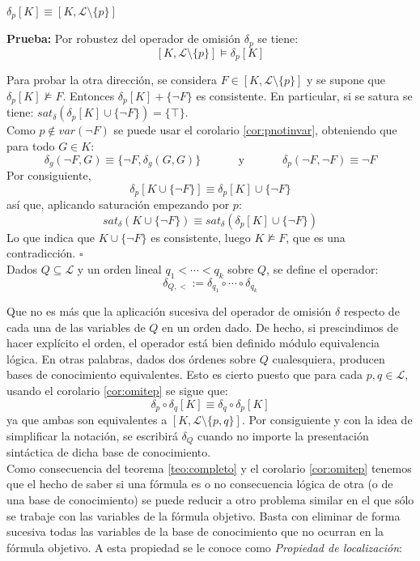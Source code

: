 \cor \label{cor:omitep} $\delta_p [K] \equiv [K, \mathcal{L} \setminus \{ p \}]$

\noindent \textbf{Prueba:} Por robustez del operador de omisión $\delta_p$ se tiene:
$$[K, \mathcal{L} \setminus \{ p \}] \vDash \delta_p [K]$$

Para probar la otra dirección, se considera $F\in [K, \mathcal{L} \setminus \{ p \}]$ y se supone que $\delta_p [K] \nvDash F$. Entonces $\delta_p [K] + \{ \neg F \}$ es consistente. En particular, si se satura se tiene: $sat_{\delta}(\delta_p [K] \cup \{ \neg F \}) = \{ \top \}$.\\
Como $p \notin var(\neg F)$ se puede usar el corolario \ref{cor:pnotinvar}, obteniendo que para todo $G\in K$:
$$\delta_g (\neg F, G) \equiv \{ \neg F, \delta_g  (G,G)  \} \;\;\;\;\;\;\;\;\;\;\;\; \text{y} \;\;\;\;\;\;\;\;\;\;\;\; \delta_p (\neg F , \neg F) \equiv \neg F$$
Por consiguiente,
$$\delta_p [K \cup \{ \neg F \}] \equiv \delta_p [K] \cup \{ \neg F \}$$
así que, aplicando saturación empezando por $p$:
$$sat_{\delta}(K \cup \{ \neg F \}) \equiv sat_{\delta}(\delta_p [K] \cup \{ \neg F \})$$
Lo que indica que $K \cup \{ \neg F \}$ es consistente, luego $K \nvDash F$, que es una contradicción. $\square$\\

Dados $Q \subseteq \mathcal{L}$ y un orden lineal $q_1 < \cdots < q_k$ sobre $Q$, se define el operador: $$\delta_{Q,<} := \delta_{q_1} \circ \cdots \circ \delta_{q_k}$$

Que no es más que la aplicación sucesiva del operador de omisión $\delta$ respecto de cada una de las variables de $Q$ en un orden dado. De hecho, si prescindimos de hacer explícito el orden, el operador está bien definido módulo equivalencia lógica. En otras palabras, dados dos órdenes sobre $Q$ cualesquiera, producen bases de conocimiento equivalentes. Esto es cierto puesto que para cada $p,q \in \mathcal{L}$, usando el corolario \ref{cor:omitep} se sigue que:
$$ \delta_p \circ \delta_q [K] \equiv \delta_q \circ \delta_p [K]$$
\noindent ya que ambas son equivalentes a $[K, \mathcal{L} \setminus \{ p,q \}]$. Por consiguiente y con la idea de simplificar la notación, se escribirá $\delta_Q$ cuando no importe la presentación sintáctica de dicha base de conocimiento.\\

Como consecuencia del teorema \ref{teo:completo} y el corolario \ref{cor:omitep} tenemos que el hecho de saber si una fórmula es o no consecuencia lógica de otra (o de una base de conocimiento) se puede reducir a otro problema similar en el que sólo se trabaje con las variables de la fórmula objetivo. Basta con eliminar de forma sucesiva todas las variables de la base de conocimiento que no ocurran en la fórmula objetivo. A esta propiedad se le conoce como \textit{Propiedad de localización}:

